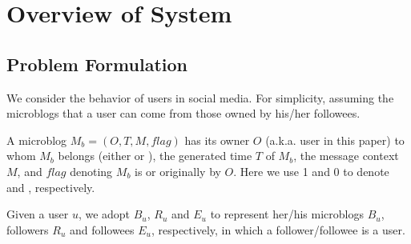 \section{Overview of System \sys{}}
\label{sec:overv}

\subsection{Problem Formulation}

\par We consider the \retg{} behavior of users in social media.
For simplicity, assuming the microblogs that a user can \ret{} come from those owned by his/her followees.


\begin{definition}
\label{def:blog}
A microblog $M_b = (O, T, M, flag)$ has its owner $O$ (a.k.a. user in this paper) to whom $M_b$ belongs (either \twd{} or \retd{}), the generated time $T$ of $M_b$, the message context $M$, and $flag$ denoting $M_b$ is \retd{} or originally \tw{} by $O$. Here we use 1 and 0 to denote \retd{} and  \tw{}, respectively.
\end{definition}

\begin{definition}
\label{def:user}
Given a user $u$, we adopt $B_u$, $R_u$ and $E_u$ to represent her/his microblogs $B_u$, followers $R_u$ and followees $E_u$,  respectively, in which a follower/followee is a user.
\end{definition}

